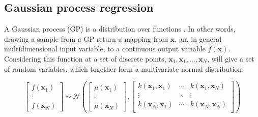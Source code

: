 \subsection{Gaussian process regression}\label{subsec:gp}

A Gaussian process (GP) is a distribution over functions \cite{rasmussenGaussianProcessesMachine2006}.  In other words, drawing a sample from a GP return a mapping from $\mathbf{x}$, an, in general multidimensional input variable, to a continuous output variable $f(\mathbf{x})$. Considering this function at a set of discrete points, $\mathbf{x}_{1}, \mathbf{x}_{1},\ldots, \mathbf{x}_{N}$, will give a set of random variables, which together form a multivariate normal distribution: 

\begin{equation}
\begin{bmatrix}  f\left(\mathbf{x}_{1}\right) \\ \vdots \\ f\left(\mathbf{x}_{N}\right) \end{bmatrix} 
\sim 
\mathcal{N}\left( 
\begin{bmatrix} \mu\left(\mathbf{x}_{1}\right) \\  \vdots \\ \mu\left(\mathbf{x}_{N}\right) \end{bmatrix}, 
\begin{bmatrix}
k(\mathbf{x}_{1}, \mathbf{x}_{1}) & \cdots & k(\mathbf{x}_{1}, \mathbf{x}_{N}) \\
\vdots & \ddots & \vdots \\
k(\mathbf{x}_{N}, \mathbf{x}_{1}) & \cdots & k(\mathbf{x}_{N}, \mathbf{x}_{N}) \\
\end{bmatrix}
\right)\label{eqn:msm_mvn}
\end{equation}

